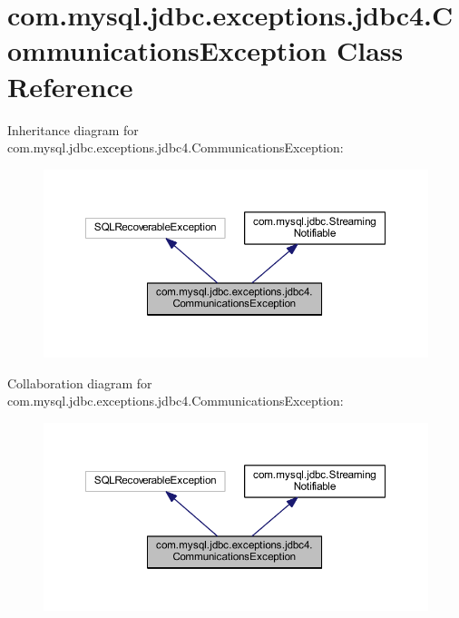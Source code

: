 \hypertarget{classcom_1_1mysql_1_1jdbc_1_1exceptions_1_1jdbc4_1_1_communications_exception}{}\section{com.\+mysql.\+jdbc.\+exceptions.\+jdbc4.\+Communications\+Exception Class Reference}
\label{classcom_1_1mysql_1_1jdbc_1_1exceptions_1_1jdbc4_1_1_communications_exception}


Inheritance diagram for com.\+mysql.\+jdbc.\+exceptions.\+jdbc4.\+Communications\+Exception\+:
\nopagebreak
\begin{figure}[H]
\begin{center}
\leavevmode
\includegraphics[width=350pt]{classcom_1_1mysql_1_1jdbc_1_1exceptions_1_1jdbc4_1_1_communications_exception__inherit__graph}
\end{center}
\end{figure}


Collaboration diagram for com.\+mysql.\+jdbc.\+exceptions.\+jdbc4.\+Communications\+Exception\+:
\nopagebreak
\begin{figure}[H]
\begin{center}
\leavevmode
\includegraphics[width=350pt]{classcom_1_1mysql_1_1jdbc_1_1exceptions_1_1jdbc4_1_1_communications_exception__coll__graph}
\end{center}
\end{figure}
